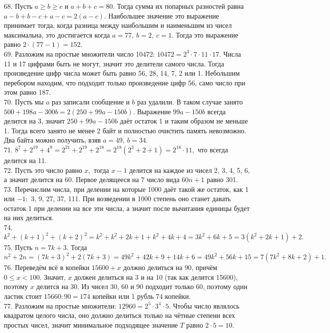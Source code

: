 68. Пусть $a\geqslant b\geqslant c$ и $a+b+c=80.$ Тогда сумма их попарных разностей равна $a-b+b-c+a-c=2(a-c).$ Наибольшее значение это выражение принимает тогда, когда разница между наибольшим и наименьшим из чисел максимальна, это достигается когда $a=77,\ b=2,\ c=1.$ Тогда это выражение равно $2\cdot(77-1)=152.$\\
69. Разложим на простые множители число 10472: $10472=2^3\cdot7\cdot11\cdot17.$ Числа 11 и 17 цифрами быть не могут, значит это делители самого числа. Тогда произведение цифр числа может быть равно 56, 28, 14, 7, 2 или 1. Небольшим перебором находим, что подходит только произведение цифр 56, само число при этом равно 187.\\
70. Пусть мы $a$ раз записали сообщение и $b$ раз удалили. В таком случае занято $500+198a-300b=2(250+99a-150b).$ Выражение $99a-150b$ всегда делится на 3, значит
$250+99a-150b$ даёт остаток 1 и таким образом не меньше 1. Тогда всего занято не менее 2 байт и полностью очистить память невозможно. Два байта можно получить, взяв $a=49,\ b=34.$\\
71. $8^7+2^{19}+4^9=2^{21}+2^{19}+2^{18}=2^{18}(2^3+2+1)=2^{18}\cdot11,$ что всегда делится на 11.\\
72. Пусть это число равно $x,$ тогда $x-1$ делится на каждое из чисел 2, 3, 4, 5, 6, а значит делится на 60. Первое делящееся на 7 число вида $60n+1$ равно 301.\\
73. Перечислим числа, при делении на которые 1000 даёт такой же остаток, как 1 или $-1:$ 3, 9, 27, 37, 111. При возведении в 1000 степень оно станет давать остаток 1 при делении на все эти числа, а значит после вычитания единицы будет на них делиться.\\
74. $k^2+(k+1)^2+(k+2)^2=k^2+k^2+2k+1+k^2+4k+4=3k^2+6k+5=3(k^2+2k+1)+2.$\\
75. Пусть $n=7k+3.$ Тогда $n^2+2n=(7k+3)^2+2(7k+3)=49k^2+42k+9+14k+6=49k^2+56k+15=7(7k^2+8k+2)+1.$\\
76. Переведём всё в копейки $15600+x$ должно делиться на 90, причём $0\leqslant x <100.$ Значит, $x$ должен делиться на 3 и на 10 (так как делится 15600), поэтому $x$ делится на 30. Из чисел 30, 60 и 90 подходит только 60, поэтому один ластик стоит $15660:90=174$ копейки или 1 рубль 74 копейки.\\
77. Разложим на простые множители: $12960=2^5\cdot3^4\cdot5.$ Чтобы число являлось квадратом целого числа, оно должно делиться только на чётные степени всех простых чисел, значит минимальное подходящее значение $T$ равно $2\cdot5=10.$\\
